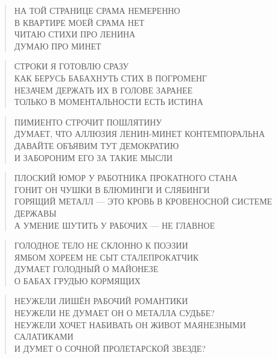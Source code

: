 \poemtitle{***}
\begin{verse}
НА ТОЙ СТРАНИЦЕ СРАМА НЕМЕРЕННО\\
В КВАРТИРЕ МОЕЙ СРАМА НЕТ\\
ЧИТАЮ СТИХИ ПРО ЛЕНИНА\\
ДУМАЮ ПРО МИНЕТ
\end{verse}

\poemtitle{***}
\begin{verse}
СТРОКИ Я ГОТОВЛЮ СРАЗУ\\
КАК БЕРУСЬ БАБАХНУТЬ СТИХ В ПОГРОМЕНГ\\
НЕЗАЧЕМ ДЕРЖАТЬ ИХ В ГОЛОВЕ ЗАРАНЕЕ\\
ТОЛЬКО В МОМЕНТАЛЬНОСТИ ЕСТЬ ИСТИНА
\end{verse}

\poemtitle{***}
\begin{verse}
ПИМИЕНТО СТРОЧИТ ПОШЛЯТИНУ\\
ДУМАЕТ, ЧТО АЛЛЮЗИЯ ЛЕНИН-МИНЕТ КОНТЕМПОРАЛЬНА\\
ДАВАЙТЕ ОБЪЯВИМ ТУТ ДЕМОКРАТИЮ\\
И ЗАБОРОНИМ ЕГО ЗА ТАКИЕ МЫСЛИ
\end{verse}

\poemtitle{***}
\begin{verse}
ПЛОСКИЙ ЮМОР У РАБОТНИКА ПРОКАТНОГО СТАНА\\
ГОНИТ ОН ЧУШКИ В БЛЮМИНГИ И СЛЯБИНГИ\\
ГОРЯЩИЙ МЕТАЛЛ — ЭТО КРОВЬ В КРОВЕНОСНОЙ СИСТЕМЕ ДЕРЖАВЫ\\
А УМЕНИЕ ШУТИТЬ У РАБОЧИХ — НЕ ГЛАВНОЕ
\end{verse}

\poemtitle{***}
\begin{verse}
ГОЛОДНОЕ ТЕЛО НЕ СКЛОННО К ПОЭЗИИ\\
ЯМБОМ ХОРЕЕМ НЕ СЫТ СТАЛЕПРОКАТЧИК\\
ДУМАЕТ ГОЛОДНЫЙ О МАЙОНЕЗЕ\\
О БАБАХ ГРУДЬЮ КОРМЯЩИХ
\end{verse}

\poemtitle{***}
\begin{verse}
НЕУЖЕЛИ ЛИШЁН РАБОЧИЙ РОМАНТИКИ\\
НЕУЖЕЛИ НЕ ДУМАЕТ ОН О МЕТАЛЛА СУДЬБЕ?\\
НЕУЖЕЛИ ХОЧЕТ НАБИВАТЬ ОН ЖИВОТ МАЯНЕЗНЫМИ САЛАТИКАМИ\\
И ДУМЕТ О СОЧНОЙ ПРОЛЕТАРСКОЙ ЗВЕЗДЕ?
\end{verse}

